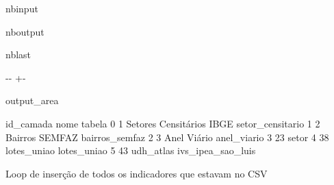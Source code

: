 \documentclass[letterpaper,10pt,brazil]{sphinxmanual}
\newlength\nbsphinxcodecellspacing
\begin{document}
\begin{sphinxuseclass}{nbinput}
{
\begin{sphinxVerbatim}[commandchars=\\\{\}]
\llap{\color{nbsphinxin}[5]:\,\hspace{\fboxrule}\hspace{\fboxsep}}  
 
\end{sphinxVerbatim}
}

\end{sphinxuseclass}
\begin{sphinxuseclass}{nboutput}
\begin{sphinxuseclass}{nblast}
{

\kern-\sphinxverbatimsmallskipamount\kern-\baselineskip
\kern+\FrameHeightAdjust\kern-\fboxrule
\vspace{\nbsphinxcodecellspacing}

\begin{sphinxuseclass}{output_area}
\begin{sphinxuseclass}{}


\begin{sphinxVerbatim}[commandchars=\\\{\}]
   id\_camada                      nome             tabela
0          1  Setores Censitários IBGE   setor\_censitario
1          2            Bairros SEMFAZ     bairros\_semfaz
2          3               Anel Viário        anel\_viario
3         23                                        setor
4         38               lotes\_uniao        lotes\_uniao
5         43                 udh\_atlas  ivs\_ipea\_sao\_luis
\end{sphinxVerbatim}



\end{sphinxuseclass}
\end{sphinxuseclass}
}

\end{sphinxuseclass}
\end{sphinxuseclass}
\sphinxAtStartPar
Loop de inserção de todos os indicadores que estavam no CSV
\end{document}
